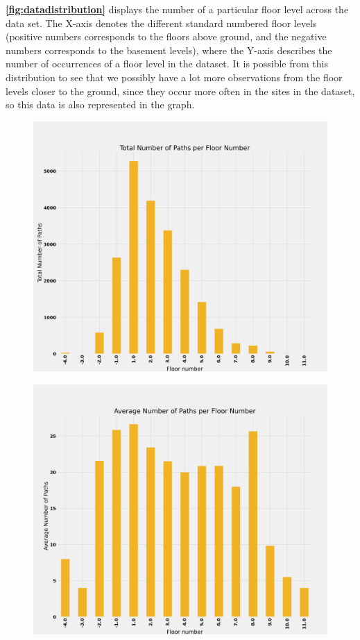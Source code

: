 \textbf{\autoref{fig:datadistribution}} displays the number of a particular floor level across the data set. The X-axis denotes the different standard numbered floor levels (positive numbers corresponds to the floors above ground, and the negative numbers corresponds to the basement levels), where the Y-axis describes the number of occurrences of a floor level in the dataset. It is possible from this distribution to see that we possibly have a lot more observations from the floor levels closer to the ground, since they occur more often in the sites in the dataset, so this data is also represented in the graph. %

\begin{figure}[ht]
    \centering
    \begin{minipage}{.45\textwidth}
    \centering
    \includegraphics[width=.9\textwidth]{Images/ProblemAnalysis/datadistribution2.png}
    \label{fig:totalpath}
    \end{minipage}
    \hspace{0.2cm}
    \begin{minipage}{.45\textwidth}
    \centering
    \includegraphics[width=.9\textwidth]{Images/ProblemAnalysis/datadistribution3.png}

\end{minipage}
\end{figure}
